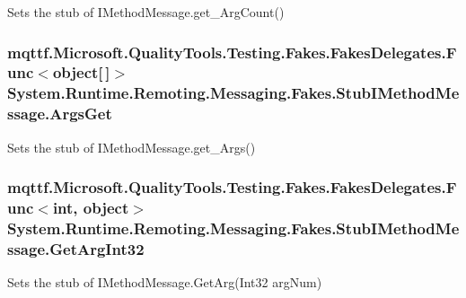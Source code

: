 Sets the stub of I\-Method\-Message.\-get\-\_\-\-Arg\-Count()

\hypertarget{class_system_1_1_runtime_1_1_remoting_1_1_messaging_1_1_fakes_1_1_stub_i_method_message_aa3eea5de375e507aac6d4fc5c245c1cb}{
\subsubsection[{Args\-Get}]{\setlength{\rightskip}{0pt plus 5cm}mqttf.\-Microsoft.\-Quality\-Tools.\-Testing.\-Fakes.\-Fakes\-Delegates.\-Func$<$object\mbox{[}$\,$\mbox{]}$>$ System.\-Runtime.\-Remoting.\-Messaging.\-Fakes.\-Stub\-I\-Method\-Message.\-Args\-Get}}\label{class_system_1_1_runtime_1_1_remoting_1_1_messaging_1_1_fakes_1_1_stub_i_method_message_aa3eea5de375e507aac6d4fc5c245c1cb}


Sets the stub of I\-Method\-Message.\-get\-\_\-\-Args()

\hypertarget{class_system_1_1_runtime_1_1_remoting_1_1_messaging_1_1_fakes_1_1_stub_i_method_message_a4b458ee489110660b6ef7eaeeef2c796}{
\subsubsection[{Get\-Arg\-Int32}]{\setlength{\rightskip}{0pt plus 5cm}mqttf.\-Microsoft.\-Quality\-Tools.\-Testing.\-Fakes.\-Fakes\-Delegates.\-Func$<$int, object$>$ System.\-Runtime.\-Remoting.\-Messaging.\-Fakes.\-Stub\-I\-Method\-Message.\-Get\-Arg\-Int32}}\label{class_system_1_1_runtime_1_1_remoting_1_1_messaging_1_1_fakes_1_1_stub_i_method_message_a4b458ee489110660b6ef7eaeeef2c796}


Sets the stub of I\-Method\-Message.\-Get\-Arg(\-Int32 arg\-Num)

